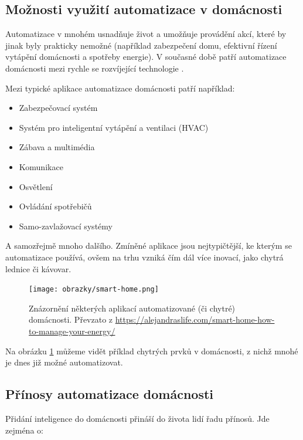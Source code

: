 \subsection*{Možnosti využití automatizace v domácnosti}
Automatizace v mnohém usnadňuje život a umožňuje provádění akcí, které by jinak byly prakticky nemožné (například zabezpečení domu, efektivní řízení vytápění domácnosti a spotřeby energie). V současné době patří automatizace domácnosti mezi rychle se rozvíjející technologie \cite{SmartHomeMarketForecast}.


Mezi typické aplikace automatizace domácnosti patří například:
\begin{itemize}
\item Zabezpečovací systém
\item Systém pro inteligentní vytápění a ventilaci (HVAC)
\item Zábava a multimédia
\item Komunikace
\item Osvětlení \cite{ClassificationOfFunctionsInSmartHome}
\item Ovládání spotřebičů
\item Samo-zavlažovací systémy \cite{HomeAutomationRPI}
\end{itemize}
A samozřejmě mnoho dalšího. Zmíněné aplikace jsou nejtypičtější, ke kterým se automatizace používá, ovšem na trhu vzniká čím dál více inovací, jako chytrá lednice či kávovar. 
\begin{figure}[hbt]
	\centering
	\texttt{[image: obrazky/smart-home.png]}
	\caption{Znázornění některých aplikací automatizované (či chytré) domácnosti. Převzato z \url{https://alejandraslife.com/smart-home-how-to-manage-your-energy/}}
	\label{homeAutomationExample}
\end{figure}
Na obrázku \ref{homeAutomationExample} můžeme vidět příklad chytrých prvků v domácnosti, z nichž mnohé je dnes již možné automatizovat.

\subsection*{Přínosy automatizace domácnosti}
Přidání inteligence do domácnosti přináší do života lidí řadu přínosů. Jde zejména o:

